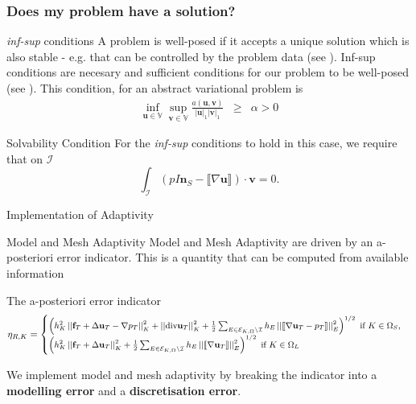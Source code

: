 \documentclass{beamer}
\theoremstyle{definition}
\begin{document}
\begin{frame}
\frametitle{Does my problem have a solution?}
\vspace{0mm}
\begin{block}{\textit{inf-sup} conditions}
A problem is well-posed if  it accepts a unique solution which is also stable - e.g. that can be controlled by the problem data (see \cite{hadamard1932probleme}). Inf-sup conditions are necesary and sufficient conditions for our problem to be well-posed (see \cite{ern2013theory}).   This condition, for an abstract variational problem is
\begin{eqnarray}\label{coerc_a}
\inf_{\textbf{u}\in \mathbb{V}}\sup_{\textbf{v}\in \mathbb{V}}\frac{a\left(\textbf{u},\textbf{v}\right)}{\left|\textbf{u}\right|_1 \left|\textbf{v}\right|_1}&\geq&\alpha>0
\end{eqnarray}
\end{block}

\begin{block}{Solvability Condition}
For the \textit{inf-sup} conditions to hold in this case, we require that on $\mathcal{I}$\vspace{-5mm}
\begin{equation}
\int_{\mathcal{I}}\left(pI \textbf{n}_S- \llbracket \nabla \textbf{u}\rrbracket\right)\cdot\textbf{v}=0.
\end{equation}
\end{block}
\end{frame}
    \begin{frame}{Implementation of Adaptivity}

\begin{block}{Model and Mesh Adaptivity}
Model and Mesh Adaptivity are driven by an a-posteriori error indicator.  This is a quantity that can be computed from available information
\end{block}

\begin{block}{The a-posteriori error indicator}
\begin{equation*}\small\label{approach1_indicator}
\small{\eta_{R,K}=\begin{cases}
	\left(h^2_K\left|\left|\textbf{f}_T+\Delta \textbf{u}_T-\nabla p_T\right|\right|^2_K+\left|\left|\text{div} \textbf{u}_T\right|\right|^2_K+\frac{1}{2}\sum_{E\in\mathcal{E}_{K,\Omega}\setminus\mathcal{I}}h_E\left|\left| \llbracket \nabla \textbf{u}_T -p_T \rrbracket \right|\right|_E^2\right)^{1/2} \text{ if }K\in\Omega_S,\\
	\left(h^2_K\left|\left|\textbf{f}_T+\Delta \textbf{u}_T\right|\right|^2_K+\frac{1}{2}\sum_{E\in\mathcal{E}_{K,\Omega}\setminus\mathcal{I}}h_E\left|\left| \llbracket \nabla \textbf{u}_T  \rrbracket \right|\right|_E^2\right)^{1/2}\text{ if }K\in\Omega_L
	\end{cases}}
\end{equation*}
\end{block}
We implement model and mesh adaptivity by breaking the indicator into a \textbf{modelling error}  and a \textbf{discretisation error}.
    \end{frame}
\end{document}

